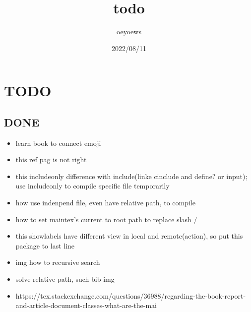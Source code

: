 \documentclass[UTF8]{article}
\title{todo \emoji{check-mark-button}}
\author{oeyoews}
\date{2022/08/11}
\begin{document}
\maketitle

\section{ TODO }%
\label{sec:TODO}

\begin{itemize}
\end{itemize}

\subsection{ DONE}%
\label{sec:DONE}

\begin{itemize}
	\item learn book to connect emoji
	\item this ref pag is not right
	\item this includeonly difference with include(linke cinclude and define? or
    input); use includeonly to compile specific file temporarily
	\item how use indenpend file, even have relative path, to compile
	\item how to set maintex's current to root path to replace slash /
	\item this showlabels have different view in local and remote(action), so put
	      this package to last line
	\item img how to recursive search
	\item solve relative path, such bib img
	\item https://tex.stackexchange.com/questions/36988/regarding-the-book-report-and-article-document-classes-what-are-the-mai
\end{itemize}
\end{document}

